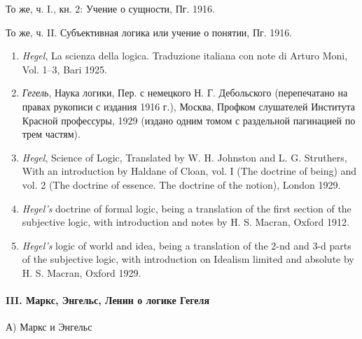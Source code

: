 {{То же, ч. I., кн. 2: Учение о сущности, Пг. 1916.

То же, ч. II. Субъективная логика или учение о понятии, Пг. 1916.

\begin{enumerate}
\item
{\em Hegel}, La scienza della logica. Traduzione italiana con note di
Arturo Moni, Vol. 1--3, Bari 1925.

\item
{\em Гегель}, Наука логики, Пер. с немецкого Н. Г. Дебольского
(перепечатано на правах рукописи с издания 1916 г.), Москва, Профком
слушателей Института Красной профессуры, 1929 (издано одним томом с
раздельной пагинацией по трем частям).

\item
{\em Hegel}, Science of Logic, Translated by W. H. Johnston and
L. G. Struthers, With an introduction by Haldane of Cloan, vol. I
(The doctrine of being) and vol. 2 (The doctrine of essence. The doctrine of
 the notion), London 1929.

\item{\em Hegel's} doctrine of formal logic, being a translation of the first
section of the subjective logic, with introduction and notes by
H. S. Macran, Oxford 1912.

\item{\em Hegel's} logic of world and idea, being a translation of the 2-nd and
3-d parts of the subjective logic, with introduction on Idealism limited and
absolute by H. S. Macran, Oxford 1929.
\end{enumerate}

\paragraph[III. Маркс, Энгельс, Ленин о логике Гегеля]
{III. Маркс, Энгельс, Ленин о логике Гегеля}

{\centering А) Маркс и Энгельс \par}

}}
